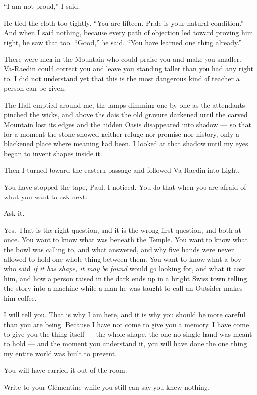 ``I am not proud,'' I said.\par

He tied the cloth too tightly. ``You are fifteen. Pride is your natural condition.'' And when I said nothing, because every path of objection led toward proving him right, he saw that too. ``Good,'' he said. ``You have learned one thing already.''\par

There were men in the Mountain who could praise you and make you smaller. Va-Raedin could correct you and leave you standing taller than you had any right to. I did not understand yet that this is the most dangerous kind of teacher a person can be given.\par

The Hall emptied around me, the lamps dimming one by one as the attendants pinched the wicks, and above the dais the old gravure darkened until the carved Mountain lost its edges and the hidden Oasis disappeared into shadow --- so that for a moment the stone showed neither refuge nor promise nor history, only a blackened place where meaning had been. I looked at that shadow until my eyes began to invent shapes inside it.\par

Then I turned toward the eastern passage and followed Va-Raedin into Light.\par

\ornament

You have stopped the tape, Paul. I noticed. You do that when you are afraid of what you want to ask next.\par

Ask it.\par

Yes. That is the right question, and it is the wrong first question, and both at once. You want to know what was beneath the Temple. You want to know what the bowl was calling to, and what answered, and why five hands were never allowed to hold one whole thing between them. You want to know what a boy who said \textit{if it has shape, it may be found} would go looking for, and what it cost him, and how a person raised in the dark ends up in a bright Swiss town telling the story into a machine while a man he was taught to call an Outsider makes him coffee.\par

I will tell you. That is why I am here, and it is why you should be more careful than you are being. Because I have not come to give you a memory. I have come to give you the thing itself --- the whole shape, the one no single hand was meant to hold --- and the moment you understand it, you will have done the one thing my entire world was built to prevent.\par

You will have carried it out of the room.\par

Write to your Clémentine while you still can say you knew nothing.\par

\ornament
